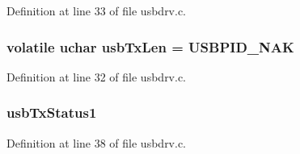 Definition at line 33 of file usbdrv.\-c.

\hypertarget{mhvlib-_vusb-_keyboard_2vusb_2usbdrv_8c_a6d1c6f67a95541d4f45d26dd80e07693}{
\subsubsection[{usb\-Tx\-Len}]{\setlength{\rightskip}{0pt plus 5cm}volatile {\bf uchar} usb\-Tx\-Len = {\bf U\-S\-B\-P\-I\-D\-\_\-\-N\-A\-K}}}\label{mhvlib-_vusb-_keyboard_2vusb_2usbdrv_8c_a6d1c6f67a95541d4f45d26dd80e07693}


Definition at line 32 of file usbdrv.\-c.

\hypertarget{mhvlib-_vusb-_keyboard_2vusb_2usbdrv_8c_a8787d5ad73afd0d305818dfbdce2bc85}{
\subsubsection[{usb\-Tx\-Status1}]{ usb\-Tx\-Status1}}\label{mhvlib-_vusb-_keyboard_2vusb_2usbdrv_8c_a8787d5ad73afd0d305818dfbdce2bc85}


Definition at line 38 of file usbdrv.\-c.

